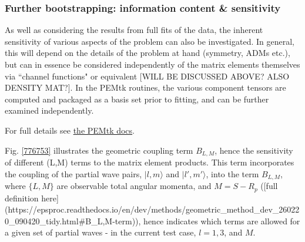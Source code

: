 \subsubsection{Further bootstrapping: information content \& sensitivity}

As well as considering the results from full fits of the data, the inherent sensitivity of various aspects of the problem can also be investigated. In general, this will depend on the details of the problem at hand (symmetry, ADMs etc.), but can in essence be considered independently of the matrix elements themselves via ``channel functions" or equivalent [WILL BE DISCUSSED ABOVE? ALSO DENSITY MAT?]. In the PEMtk routines, the various component tensors are computed and packaged as a basis set prior to fitting, and can be further examined independently. 

For full details see \href{https://pemtk.readthedocs.io/en/latest/fitting/PEMtk_fitting_basis-set_demo_050621-full.html}{the PEMtk docs}.

Fig. \ref{776753} illustrates the geometric coupling term $B_{L,M}$, hence the sensitivity of different (L,M) terms to the matrix element products. This term incorporates the coupling of the partial wave pairs, $|l,m\rangle$ and $|l',m'\rangle$, into the term $B_{L,M}$, where $\{L,M\}$ are observable total angular momenta, and $M = S-R_{p}$ ([full definition here](https://epsproc.readthedocs.io/en/dev/methods/geometric_method_dev_260220_090420_tidy.html#B_{L,M}-term)), hence indicates which terms are allowed for a given set of partial waves - in the current test case, $l=1,3$, and $M$.
